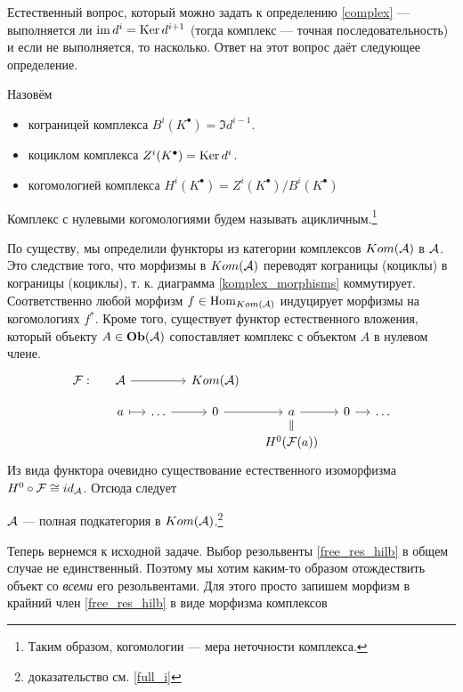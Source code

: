 \documentclass[../main.tex]{subfiles}
\begin{document}
Естественный вопрос, который можно задать к определению \ref{complex} --- выполняется ли $\mathop{\mathrm{im}}\nolimits d^i = \mathop{\mathrm{Ker}}\nolimits d^{i+1}$ (тогда комплекс --- точная последовательность) и если не выполняется, то насколько. Ответ на этот вопрос даёт следующее определение.
\begin{to_def}
Назовём 
\begin{itemize}
\item кограницей комплекса $B^i(K^\bullet) = \Im d^{i-1}$.
\item коциклом комплекса $Z^i(K^\bullet) = \mathop{\mathrm{Ker}}\nolimits d^{i}$.
\item когомологией комплекса $H^i(K^\bullet) = Z^i(K^\bullet)/B^i(K^\bullet)$
\end{itemize}
Комплекс с нулевыми когомологиями будем называть ацикличным.\footnote{Таким образом, когомологии --- мера неточности комплекса. }
\end{to_def}
По существу, мы определили функторы из категории комплексов $Kom(\mathcal{A})$ в $\mathcal{A}$. Это следствие того, что морфизмы в $Kom(\mathcal{A})$ переводят кограницы (коциклы) в кограницы (коциклы), т. к. диаграмма \eqref{komplex_morphisms} коммутирует. Соответственно любой морфизм $f\in \operatorname{Hom}_{Kom(\mathcal{A})}$ индуцирует морфизмы на когомологиях $f^*$.
Кроме того, существует функтор естественного вложения, который объекту $A \in \mathbf{Ob}(\mathcal{A})$ сопоставляет комплекс с объектом $A$ в нулевом члене.
\begin{equation*}
    \begin{tikzcd}[sep=small]
	{\F:} & \A & {} & {Kom(\A)} \\
	{} & a & \ldots & 0 & a & 0 & \ldots \\
	&&&& {H^0(\F(a))}
	\arrow[from=2-3, to=2-4]
	\arrow[from=2-4, to=2-5]
	\arrow[from=2-5, to=2-6]
	\arrow[from=2-6, to=2-7]
	\arrow[Rightarrow, no head, from=2-5, to=3-5]
	\arrow[maps to, from=2-2, to=2-3]
	\arrow[from=1-2, to=1-4]
\end{tikzcd}
\end{equation*}
Из вида функтора очевидно существование естественного изоморфизма $H^0\circ \mathcal{F} \cong id_{\mathcal{A}}$. Отсюда следует
\begin{to_suj}
$\mathcal{A}$ --- полная подкатегория в $Kom(\mathcal{A})$.\footnote{доказательство см. \ref{full_i}}
\end{to_suj}
Теперь вернемся к исходной задаче. Выбор резольвенты \eqref{free_res_hilb} в общем случае не единственный. Поэтому мы хотим каким-то образом отождествить объект со \emph{всеми} его резольвентами. Для этого просто запишем морфизм в крайний член \ref{free_res_hilb} в виде морфизма комплексов
\end{document}

